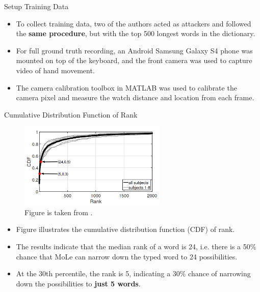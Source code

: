 \documentclass[ucs,9pt]{beamer}
\begin{document}
\begin{frame}{Setup Training Data}
	\begin{itemize}
		\item To collect training data, two of the authors acted as attackers and followed the \textbf{same procedure}, but with the top 500 longest words in the dictionary.
		\item For full ground truth recording, an Android Samsung Galaxy S4 phone was mounted on top of the keyboard, and the front camera was used to capture video of hand movement. 
		\item The camera calibration toolbox in MATLAB was used to calibrate the camera pixel and measure the watch distance and location from each frame.
	\end{itemize}
\end{frame}


\begin{frame}{Cumulative Distribution Function of Rank}
\begin{figure}
	\centering
	\includegraphics[width=7cm]{imgs/cdfInferTyped.png}
	\caption{Figure is taken from \cite{b1}.}
\end{figure}
	
\begin{itemize}
	\item Figure illustrates the cumulative distribution function (CDF) of rank. %
	 \item The results indicate that the median rank of a word is 24, i.e. there is a 50\% chance that MoLe can narrow down the typed word to 24 possibilities. 
	 \item At the 30th percentile, the rank is 5, indicating a 30\% chance of narrowing down the possibilities to \textbf{just 5 words}. %
\end{itemize}
\end{frame}
\end{document}
